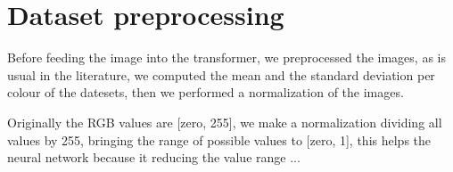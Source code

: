 \section{Dataset preprocessing}\label{sec:dataset-preprocessing}

Before feeding the image into the transformer, we preprocessed the images, as is usual in the literature, we computed the mean and the standard deviation per colour of the datesets, then we performed a normalization of the images.

Originally the RGB values are [zero, 255], we make a normalization dividing all values by 255, bringing the range of possible values to [zero, 1], this helps the neural network because it reducing the value range ... %


